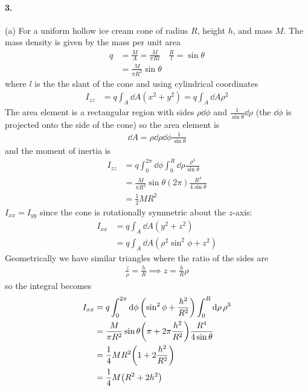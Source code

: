 \documentclass[../hw.tex]{subfiles}
\begin{document}
\paragraph*{3.} (a) For a uniform hollow ice cream cone of radius $R$, height $h$, and mass $M$. 
The mass density is given by the mass per unit area
\begin{align*}
    q &= \frac{M}{A} = \frac{M}{\pi R l} \quad \frac{R}{l} = \sin\theta \\
    &= \frac{M}{\pi R^2} \sin\theta
\end{align*} 
where $l$ is the the slant of the cone and using cylindrical coordinates 
\begin{align*}
    I_{zz} &= q \int_A \dd{A} (x^2 + y^2) = q \int_A \dd{A} \rho^2
\end{align*}
The area element is a rectangular region with sides $\rho \dd{\phi}$ and $\frac{1}{\sin\theta} \dd{\rho}$
(the $\dd{\phi}$ is projected onto the side of the cone) so the area element is
\begin{align*}
    \dd{A} = \rho \dd{\rho} \dd{\phi} \frac{1}{\sin\theta}
\end{align*}
and the moment of inertia is
\begin{align*}
    I_{zz} &= q \int_0^{2\pi} \dd{\phi} \int_0^R \dd{\rho} \frac{\rho^3}{\sin\theta} \\
    &= \frac{M}{\pi R^2} \sin\theta (2\pi) \frac{R^4}{4 \sin\theta} \\
    &= \frac{1}{2} M R^2
\end{align*}
$I_{xx} = I_{yy}$ since the cone is rotationally symmetric about the $z$-axis:
\begin{align*}
    I_{xx} &= q \int_A \dd{A} (y^2 + z^2) \\
    &= q \int_A \dd{A} (\rho^2 \sin^2\phi + z^2) 
\end{align*}
Geometrically we have similar triangles where the ratio of the sides are
\begin{align*}
    \frac{z}{\rho} = \frac{h}{R} \implies z = \frac{h}{R} \rho
\end{align*}
so the integral becomes
\begin{align*}
    I_{xx} &= q  \int_0^{2\pi} \dd{\phi} \qt(\sin^2\phi + \frac{h^2}{R^2}) 
        \int_0^R \dd{\rho}\rho^3 \\
    &= \frac{M}{\pi R^2} \sin\theta \qt(\pi + 2\pi \frac{h^2}{R^2}) \frac{R^4}{4 \sin\theta} \\
    &= \frac{1}{4} M R^2 \qt(1 + 2 \frac{h^2}{R^2}) \\
    &= \frac{1}{4} M \qt(R^2 + 2h^2)
\end{align*}
\end{document}
